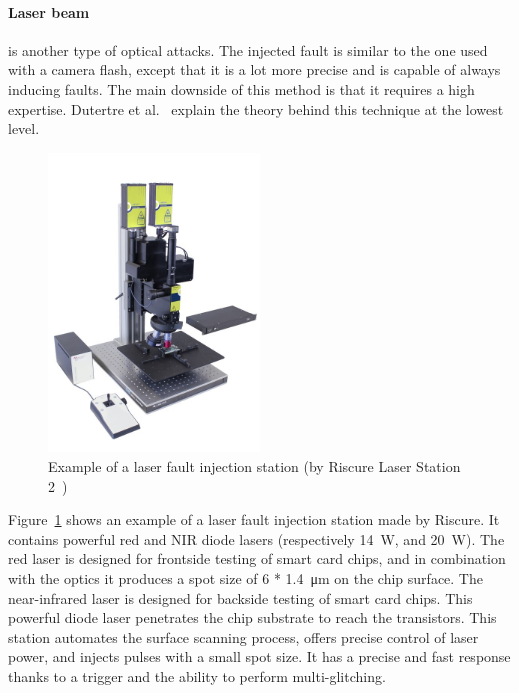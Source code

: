 \paragraph{Laser beam} is another type of optical attacks.
The injected fault is similar to the one used with a camera flash, except that it is a lot more precise and is capable of always inducing faults.
The main downside of this method is that it requires a high expertise.
Dutertre et al.~\cite{DBCDFFGHLMDPR-18-fdtc} explain the theory behind this technique at the lowest level.

\begin{figure}[ht]
    \centering
    \includegraphics[width=0.5\textwidth]{c2_soa/img/LS2.jpeg}
    \caption{Example of a laser fault injection station (by Riscure Laser Station 2~\cite{riscure_station})}
    \label{fig:ls2}
\end{figure}

Figure~\ref{fig:ls2} shows an example of a laser fault injection station made by Riscure.
It contains powerful red and NIR diode lasers (respectively \SI{14}{\watt}, and \SI{20}{\watt}). The red laser is designed for frontside testing of smart card chips, and in combination with the optics it produces a spot size of 6 * \SI{1.4}{\micro\metre} on the chip surface. The near-infrared laser is designed for backside testing of smart card chips. This powerful diode laser penetrates the chip substrate to reach the transistors.
This station automates the surface scanning process, offers precise control of laser power, and injects pulses with a small spot size. It has a precise and fast response thanks to a trigger and the ability to perform multi-glitching.

